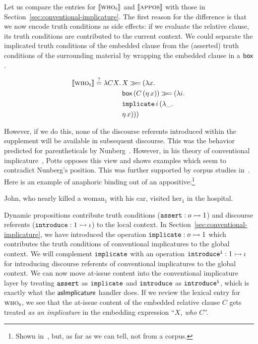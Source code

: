 Let us compare the entries for $\llbracket \textsc{who}_{\textsc{s}} \rrbracket$ and
$\llbracket \textsc{appos} \rrbracket$ with those in
Section~\ref{sec:conventional-implicature}. The first reason for the
difference is that we now encode truth conditions as side effects: if we
evaluate the relative clause, its truth conditions are contributed to the
current context. We could separate the implicated truth conditions of the
embedded clause from the (asserted) truth conditions of the surrounding
material by wrapping the embedded clause in a $\textsf{box}$.

$$
\llbracket \textsc{who}_{\textsc{s}} \rrbracket \stackrel{?}{=} \lambda C X.\, \begin{aligned}[t]
    &X \mathbin{\gg\!=} (\lambda x.\,  \\
    &\textsf{box}\,(C\,(\eta\,x)) \mathbin{\gg\!=} (\lambda i.\,  \\
    &\mathtt{implicate}\,i\,(\lambda \_.\,  \\
    &\eta\,x)))
  \end{aligned}
$$

However, if we do this, none of the discourse referents introduced within
the supplement will be available in subsequent discourse. This was the
behavior predicted for parentheticals by
Nunberg~\cite{nunberg1990linguistics}. However, in his theory of
conventional implicature~\cite{potts2005logic}, Potts opposes this view and
shows examples which seem to contradict Nunberg's position. This was
further supported by corpus studies in~\cite{anderbois2010crossing}. Here
is an example of anaphoric binding out of an appositive:\footnote{Shown
  in~\cite{anderbois2010crossing}, but, as far as we can tell, not from a
  corpus.}

\begin{exe}
  \ex John, who nearly killed a woman$_1$ with his car, visited her$_1$ in
  the hospital. \label{ex:hospital}
\end{exe}

Dynamic propositions contribute truth conditions ($\mathtt{assert} : o \rightarrowtail 1$)
and discourse referents ($\mathtt{introduce} : 1 \rightarrowtail \iota$) to the local
context. In Section~\ref{sec:conventional-implicature}, we have introduced
the operation $\mathtt{implicate} : o \rightarrowtail 1$ which contributes the truth
conditions of conventional implicatures to the global context. We will
complement $\mathtt{implicate}$ with an operation
$\mathtt{introduce^i} : 1 \rightarrowtail \iota$ for introducing discourse referents of
conventional implicatures to the global context. We can now move at-issue
content into the conventional implicature layer by treating $\mathtt{assert}$
as $\mathtt{implicate}$ and $\mathtt{introduce}$ as $\mathtt{introduce^i}$, which is
exactly what the $\textsf{asImplicature}$ handler does. If we review the lexical
entry for $\textsc{who}_{\textsc{s}}$, we see that the at-issue content of the
embedded relative clause $C$ gets treated \emph{as an implicature} in the
embedding expression ``\emph{$X$, who $C$}''.

